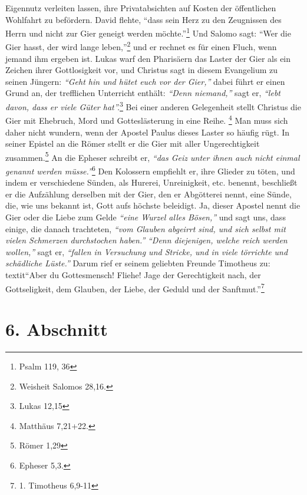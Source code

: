Eigennutz verleiten lassen, ihre Privatabsichten auf Kosten der öffentlichen
Wohlfahrt zu befördern. David flehte,
"`dass sein Herz zu den Zeugnissen des
Herrn und nicht zur Gier geneigt werden möchte."'\footnote{Psalm 119, 36}
Und Salomo sagt: "`Wer die Gier hasst, der wird lange leben,"'\footnote{Weisheit Salomos 28,16.}
und er rechnet es für einen Fluch, wenn jemand ihm ergeben ist. Lukas
warf den Pharisäern das Laster der Gier als ein
Zeichen ihrer Gottlosigkeit
vor, und Christus sagt in diesem Evangelium zu seinen Jüngern:
\textit{"`Geht hin und
hütet euch vor der Gier,"'} dabei führt er einen Grund an, der trefflichen
Unterricht enthält: \textit{"`Denn niemand,"'} sagt er,
\textit{"`lebt davon, dass er viele Güter hat"'.}\footnote{Lukas 12,15}
Bei einer anderen Gelegenheit stellt Christus die Gier mit Ehebruch, Mord und
Gotteslästerung in eine Reihe.
\footnote{Matthäus 7,21+22.}
Man muss sich daher nicht wundern, wenn der Apostel Paulus dieses
Laster so häufig rügt. In seiner Epistel an die Römer stellt er die Gier mit
aller Ungerechtigkeit zusammen.\footnote{Römer 1,29}
An die Epheser schreibt er,
\textit{"`das Geiz unter ihnen auch nicht einmal genannt werden müsse."'}\footnote{Epheser 5,3.}
Den Kolossern empfiehlt er, ihre Glieder zu töten, und indem er
verschiedene Sünden, als Hurerei, Unreinigkeit, etc. benennt, beschließt er
die Aufzählung derselben mit der Gier, den er Abgötterei
nennt, eine Sünde,
die, wie uns bekannt ist, Gott aufs höchste beleidigt. Ja, dieser Apostel nennt
die Gier oder die Liebe zum Gelde \textit{"`eine Wurzel alles Bösen,"'}
 und sagt uns, dass
einige, die danach trachteten, \textit{"`vom Glauben abgeirrt sind, und sich
selbst
mit vielen Schmerzen durchstochen haben."'} \textit{"`Denn diejenigen, welche
reich
werden wollen,"'} sagt er, \textit{"`fallen in Versuchung und Stricke, und in
viele
törrichte und schädliche Lüste."'} Darum rief er seinem geliebten Freunde
Timotheus zu:\\textit{"`Aber du Gottesmensch! Fliehe! Jage der
Gerechtigkeit
nach, der Gottseligkeit, dem Glauben, der Liebe, der Geduld und der
Sanftmut."'}\footnote{1. Timotheus 6,9-11}

\section{6. Abschnitt} \label{kap13_ab6}

